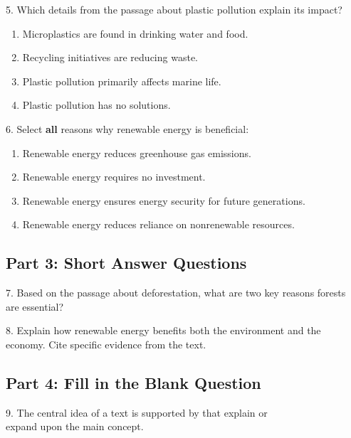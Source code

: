 \documentclass[12pt]{article}
\begin{document}
\vspace{1em}

5. Which details from the passage about plastic pollution explain its impact?  
\begin{enumerate}[label=\Alph*.]
    \item Microplastics are found in drinking water and food.  
    \item Recycling initiatives are reducing waste.  
    \item Plastic pollution primarily affects marine life.  
    \item Plastic pollution has no solutions.  
\end{enumerate}

\vspace{1cm}

6. Select \textbf{all} reasons why renewable energy is beneficial:  
\begin{enumerate}[label=\Alph*.]
    \item Renewable energy reduces greenhouse gas emissions.  
    \item Renewable energy requires no investment.  
    \item Renewable energy ensures energy security for future generations.  
    \item Renewable energy reduces reliance on nonrenewable resources.  
\end{enumerate}



\subsection*{Part 3: Short Answer Questions}

7. Based on the passage about deforestation, what are two key reasons forests \\are essential?  
\vspace{4cm}

8. Explain how renewable energy benefits both the environment and the \\economy. Cite specific evidence from the text.  
\vspace{3cm}

\subsection*{Part 4: Fill in the Blank Question}
\vspace{1cm}
9. The central idea of a text is supported by \underline{\hspace{4cm}} that explain or \\expand upon the main concept.  
\vspace{2cm}
\end{document}
